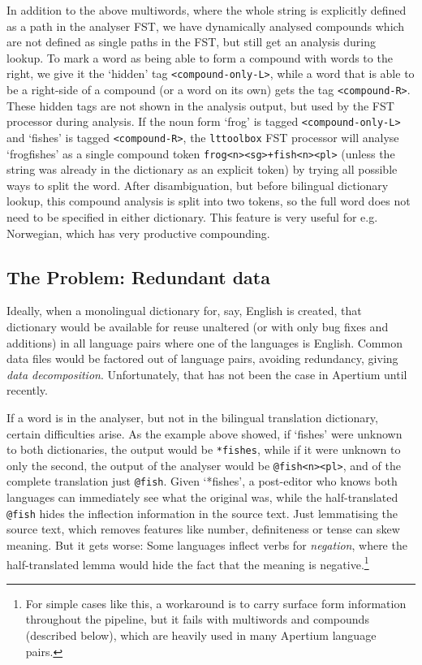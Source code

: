 \documentclass[10pt, a4paper]{article}
\newcommand{\ana}[1]{\texttt{#1}}
\newcommand{\f}[1]{`#1'}
\newcommand{\tool}[1]{\texttt{#1}}
\begin{document}
In addition to the above multiwords, where the whole string is
explicitly defined as a path in the analyser FST, we have dynamically
analysed compounds which are not defined as single paths in the FST,
but still get an analysis during lookup. To mark a word as being able
to form a compound with words to the right, we give it the \f{hidden}
tag \ana{<compound-only-L>}, while a word that is able to be a
right-side of a compound (or a word on its own) gets the tag
\ana{<compound-R>}. These hidden tags are not shown in the analysis
output, but used by the FST processor during analysis. If the noun
form \f{frog} is tagged \ana{<compound-only-L>} and \f{fishes} is
tagged \ana{<compound-R>}, the \tool{lttoolbox} FST processor will
analyse \f{frogfishes} as a single compound token
\ana{frog<n><sg>+fish<n><pl>} (unless the string was already in the
dictionary as an explicit token) by trying all possible ways to split
the word. After disambiguation, but before bilingual dictionary
lookup, this compound analysis is split into two tokens, so the full
word does not need to be specified in either dictionary. This feature
is very useful for e.g. Norwegian, which has very productive
compounding.

\subsection{The Problem: Redundant data}
\label{sec:problem}

Ideally, when a monolingual dictionary for, say, English is created,
that dictionary would be available for reuse unaltered (or with only
bug fixes and additions) in all language pairs where one of the
languages is English. Common data files would be factored out of
language pairs, avoiding redundancy, giving \emph{data decomposition}.
Unfortunately, that has not been the case in Apertium until recently.

If a word is in the analyser, but not in the bilingual translation
dictionary, certain difficulties arise. As the example above showed,
if \f{fishes} were unknown to both dictionaries, the output would be
\ana{*fishes}, while if it were unknown to only the second, the output
of the analyser would be \ana{@fish<n><pl>}, and of the complete
translation just \ana{@fish}. Given \f{*fishes}, a post-editor who
knows both languages can immediately see what the original was, while
the half-translated \ana{@fish} hides the inflection information in
the source text. Just lemmatising the source text, which removes
features like number, definiteness or tense can skew meaning.  But it
gets worse: Some languages inflect verbs for \emph{negation}, where
the half-translated lemma would hide the fact that the meaning is
negative.\footnote{For simple cases like this, a workaround is to
    carry surface form information throughout the pipeline, but it
fails with multiwords and compounds (described below), which are
heavily used in many Apertium language pairs.}
\end{document}
